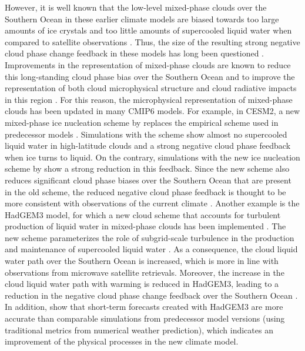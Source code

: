 However, it is well known that the low-level mixed-phase clouds over the
Southern Ocean in these earlier climate models are biased towards too large
amounts of ice crystals and too little amounts of supercooled liquid water when
compared to satellite observations \autocite{BodasSalcedo2016}. Thus, the size
of the resulting strong negative cloud phase change feedback in these models
has long been questioned \autocite{McCoy2015, Tan2016}. Improvements in the
representation of mixed-phase clouds are known to reduce this long-standing
cloud phase bias over the Southern Ocean \autocite{BodasSalcedo2016, McCoy2016}
and to improve the representation of both cloud microphysical structure and
cloud radiative impacts in this region \autocite{Hyder2018, Kay2016}. For this
reason, the microphysical representation of mixed-phase clouds has been updated
in many \acs{CMIP}6 models. For example, in \acs{CESM}2, a new mixed-phase ice
nucleation scheme by \textcite{Hoose2010} replaces the \textcite{Meyers1992}
empirical scheme used in predecessor models \autocite{Gettelman2019}.
Simulations with the \textcite{Meyers1992} scheme show almost no supercooled
liquid water in high-latitude clouds and a strong negative cloud phase feedback
when ice turns to liquid. On the contrary, simulations with the new ice
nucleation scheme by \textcite{Hoose2010} show a strong reduction in this
feedback. Since the new scheme also reduces significant cloud phase biases over
the Southern Ocean that are present in the old scheme, the reduced negative
cloud phase feedback is thought to be more consistent with observations of the
current climate \autocite{Gettelman2019}. Another example is the \acs{HadGEM}3
model, for which a new cloud scheme that accounts for turbulent production of
liquid water in mixed-phase clouds has been implemented
\autocite{BodasSalcedo2019}. The new scheme parameterizes the role of
subgrid-scale turbulence in the production and maintenance of supercooled
liquid water \autocite{Furtado2016}. As a consequence, the cloud liquid water
path over the Southern Ocean is increased, which is more in line with
observations from microwave satellite retrievals. Moreover, the increase in the
cloud liquid water path with warming is reduced in \acs{HadGEM}3, leading to a
reduction in the negative cloud phase change feedback over the Southern Ocean
\autocite{BodasSalcedo2019}. In addition, \textcite{Williams2020} show that
short-term forecasts created with \acs{HadGEM}3 are more accurate than
comparable simulations from predecessor model versions (using traditional
metrics from numerical weather prediction), which indicates an improvement of
the physical processes in the new climate model.

